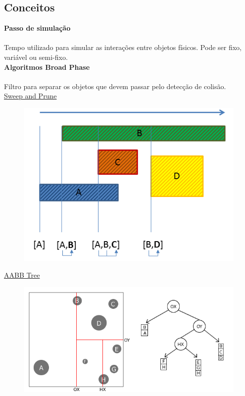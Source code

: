 \documentclass[plainboxedsections]{sciposter}
\begin{document}
\begin{multicols}{2}
  \section*{Conceitos}
  \textbf{Passo de simulação} \\
  \\[1ex]
  Tempo utilizado para simular as interações entre objetos físicos. Pode ser fixo, variável ou semi-fixo.
  \\[2ex]
  \textbf{Algoritmos Broad Phase} \\
  \\[1ex]
  Filtro para separar os objetos que devem passar pelo detecção de colisão.
  \\[1ex]
  \underline{Sweep and Prune}\\
  \begin{figure}
    \includegraphics[scale=2]{sp.png}
  \end{figure}
  \underline{AABB Tree}\\
  \begin{figure}
    \includegraphics[scale=1.5]{aabb.png}

\end{figure}
\end{multicols}
\end{document}
